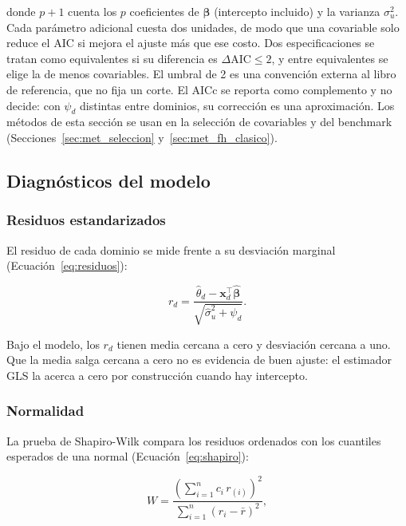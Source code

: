 donde $p+1$ cuenta los $p$ coeficientes de $\boldsymbol{\beta}$ (intercepto incluido) y la varianza $\sigma_u^2$. Cada parámetro adicional cuesta dos unidades, de modo que una covariable solo reduce el AIC si mejora el ajuste más que ese costo. Dos especificaciones se tratan como equivalentes si su diferencia es $\Delta\text{AIC} \leq 2$, y entre equivalentes se elige la de menos covariables. El umbral de 2 es una convención externa al libro de referencia, que no fija un corte. El AICc se reporta como complemento y no decide: con $\psi_d$ distintas entre dominios, su corrección es una aproximación. Los métodos de esta sección se usan en la selección de covariables y del benchmark (Secciones~\ref{sec:met_seleccion} y~\ref{sec:met_fh_clasico}).

\subsection{Diagnósticos del modelo}
\label{subsec:diagnosticos}

\subsubsection{Residuos estandarizados}

El residuo de cada dominio se mide frente a su desviación marginal (Ecuación~\ref{eq:residuos}):

\begin{equation}
    r_d = \frac{\hat{\theta}_d - \mathbf{x}_d^\top \hat{\boldsymbol{\beta}}}{\sqrt{\hat{\sigma}_u^2 + \psi_d}} .
    \label{eq:residuos}
\end{equation}

Bajo el modelo, los $r_d$ tienen media cercana a cero y desviación cercana a uno. Que la media salga cercana a cero no es evidencia de buen ajuste: el estimador GLS la acerca a cero por construcción cuando hay intercepto.

\subsubsection{Normalidad}

La prueba de Shapiro-Wilk \cite{ShapiroWilk1965} compara los residuos ordenados con los cuantiles esperados de una normal (Ecuación~\ref{eq:shapiro}):

\begin{equation}
    W = \frac{\left(\sum_{i=1}^{n} c_i\, r_{(i)}\right)^2}{\sum_{i=1}^{n} (r_i - \bar{r})^2},
    \label{eq:shapiro}
\end{equation}

